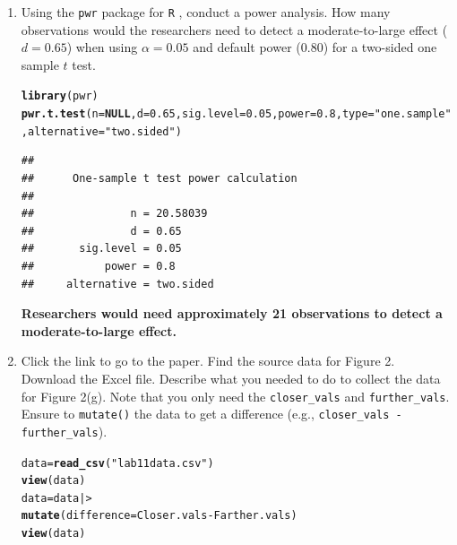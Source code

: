 \documentclass{article}\usepackage[]{graphicx}\usepackage[]{xcolor}
\makeatletter
\newcommand{\hlnum}[1]{\textcolor[rgb]{0.686,0.059,0.569}{#1}}%
\newcommand{\hlsng}[1]{\textcolor[rgb]{0.192,0.494,0.8}{#1}}%
\newcommand{\hlopt}[1]{\textcolor[rgb]{0,0,0}{#1}}%
\newcommand{\hldef}[1]{\textcolor[rgb]{0.345,0.345,0.345}{#1}}%
\newcommand{\hlkwa}[1]{\textcolor[rgb]{0.161,0.373,0.58}{\textbf{#1}}}%
\newcommand{\hlkwb}[1]{\textcolor[rgb]{0.69,0.353,0.396}{#1}}%
\newcommand{\hlkwc}[1]{\textcolor[rgb]{0.333,0.667,0.333}{#1}}%
\newcommand{\hlkwd}[1]{\textcolor[rgb]{0.737,0.353,0.396}{\textbf{#1}}}%
\newenvironment{kframe}{%
 \def\at@end@of@kframe{}%
 \ifinner\ifhmode%
  \def\at@end@of@kframe{\end{minipage}}%
  \begin{minipage}{\columnwidth}%
 \fi\fi%
 \def\FrameCommand##1{\hskip\@totalleftmargin \hskip-\fboxsep
 \colorbox{shadecolor}{##1}\hskip-\fboxsep
     \hskip-\linewidth \hskip-\@totalleftmargin \hskip\columnwidth}%
 \MakeFramed {\advance\hsize-\width
   \@totalleftmargin\z@ \linewidth\hsize
   \@setminipage}}%
 {\par\unskip\endMakeFramed%
 \at@end@of@kframe}
\newenvironment{knitrout}{}{} %
\makeatother
\begin{document}
\begin{enumerate}
\item Using the \texttt{pwr} package for \texttt{R} \citep{pwr},
conduct a power analysis. How many observations would the researchers 
need to detect a moderate-to-large effect ($d=0.65$) when using 
$\alpha=0.05$ and default power (0.80) for a two-sided one sample 
$t$ test.

\begin{knitrout}
\color{fgcolor}\begin{kframe}
\begin{alltt}
\hlkwd{library}\hldef{(pwr)}
\hlkwd{pwr.t.test}\hldef{(}\hlkwc{n} \hldef{=} \hlkwa{NULL}\hldef{,} \hlkwc{d} \hldef{=} \hlnum{0.65}\hldef{,} \hlkwc{sig.level} \hldef{=} \hlnum{0.05}\hldef{,} \hlkwc{power} \hldef{=} \hlnum{0.8}\hldef{,} \hlkwc{type} \hldef{=} \hlsng{"one.sample"}\hldef{,} \hlkwc{alternative} \hldef{=} \hlsng{"two.sided"}\hldef{)}
\end{alltt}
\begin{verbatim}
## 
##      One-sample t test power calculation 
## 
##               n = 20.58039
##               d = 0.65
##       sig.level = 0.05
##           power = 0.8
##     alternative = two.sided
\end{verbatim}
\end{kframe}
\end{knitrout}

\textbf{Researchers would need approximately 21 observations to detect a moderate-to-large
effect.}

\item Click the link to go to the paper. Find the source data for 
Figure 2. Download the Excel file. Describe what you needed to
do to collect the data for Figure 2(g). Note that you only need the 
\texttt{closer\_vals} and \texttt{further\_vals}. Ensure to 
\texttt{mutate()} the data to get a difference 
(e.g., \texttt{closer\_vals - further\_vals}).

\begin{knitrout}
\color{fgcolor}\begin{kframe}
\begin{alltt}
\hldef{data} \hlkwb{=} \hlkwd{read_csv}\hldef{(}\hlsng{"lab11data.csv"}\hldef{)}
\hlkwd{view}\hldef{(data)}
\hldef{data} \hlkwb{=} \hldef{data |>}
  \hlkwd{mutate}\hldef{(}\hlkwc{difference} \hldef{= Closer.vals} \hlopt{-} \hldef{Farther.vals)}
\hlkwd{view}\hldef{(data)}
\end{alltt}
\end{kframe}
\end{knitrout}


\end{enumerate}
\end{document}
